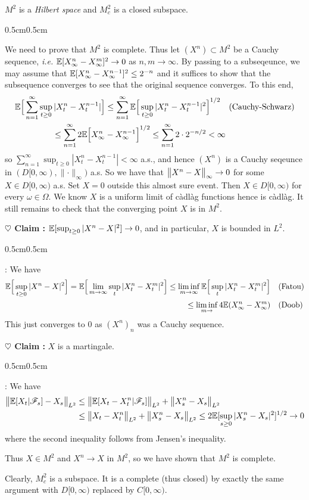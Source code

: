 \documentclass[12pt,a4paper]{article}
\newenvironment{proof}
{\begin{changemargin}{0.5cm}{0.5cm} 
	}%
	{\end{changemargin}
}
\newenvironment{subproof}
{\begin{changemargin}{0.5cm}{0.5cm} 
	}%
	{\end{changemargin}
}
\newenvironment{p}
{\begin{proof} 
	}%
	{\end{proof}
}
\begin{document}
\prop $M^2$ is a \emph{Hilbert space} and $M_c^2$ is a closed subspace.
\begin{p}
\pf We need to prove that $M^2$ is complete. Thus let $(X^n) \subset M^2$ be a Cauchy sequence, \textit{i.e.} $\mathbb{E}[X_{\infty}^n - X_{\infty}^m]^2 \rightarrow 0$ as $n,m\rightarrow \infty$. By passing to a subseqeunce, we may assume that $\mathbb{E}[X_{\infty}^n - X_{\infty}^{n-1}]^2 \leq 2^{-n}$ and it suffices to show that the subsequence converges to see that the original sequence converges. To this end,
\begin{align*}
\mathbb{E} \Big[ \sum_{n=1}^{\infty} \sup_{t\geq 0} |X_t^n - X_t^{n-1}| \Big] \leq \sum_{n=1}^{\infty} \mathbb{E} \Big[\sup_{t\geq 0} |X_t^n - X_t^{n-1}|^2 & \Big]^{1/2} \quad \text{(Cauchy-Schwarz)}\\
\leq \sum_{n=1}^{\infty} 2\mathbb{E} \Big[ X_{\infty}^n - X_{\infty}^{n-1}\Big]^{1/2} \leq \sum_{n=1}^{\infty} 2\cdot 2^{-n/2} & < \infty 
\end{align*}
so
$\sum_{n=1}^{\infty} \sup_{t\geq 0} |X_t^n - X_t^{n-1}|< \infty$ a.s., and hence $(X^n)$ is a Cauchy seqeunce in $(D[0, \infty),\parallel \cdot \parallel_{\infty})$ a.s. So we have that $\bigl\lVert X^n -X\bigr\rVert_{\infty} \rightarrow 0$ for some $X\in D[0, \infty)$ a.s. Set $X=0$ outside this almost sure event. Then $X\in D[0,\infty)$ for every $\omega \in \Omega$. We know $X$ is a uniform limit of c\`adl\`ag functions hence is c\`adl\`ag. It still remains to check that the converging point $X$ is in $M^2$.

\textbf{$\heartsuit$ Claim :} $\mathbb{E}[\sup_{t\geq 0} |X^n -X|^2] \rightarrow 0$, and in particular, $X$ is bounded in $L^2$.
\begin{subproof}
: We have
\begin{align*}
\mathbb{E} \Big[\sup_{t\geq 0}|X^n -X|^2 \Big] = \mathbb{E} \Big[ \lim_{m\rightarrow \infty} \sup_{t} |X_t^n -X_t^m|^2\Big] \leq \liminf_{m\rightarrow \infty}\mathbb{E}\Big[ \sup_t |X_t^n -X_t^{m}|^2\Big]& \quad \text{(Fatou)} \\
\leq \liminf_{m\rightarrow} 4 \mathbb{E}(X_{\infty}^n -X_{\infty}^m)& \quad \text{(Doob)}
\end{align*}
This just converges to 0 as $(X^n)_n$ was a Cauchy sequence. 
\end{subproof}
\textbf{$\heartsuit$ Claim :} $X$ is a martingale.
\begin{subproof}
: We have
\begin{align*}
\bigl\lVert\mathbb{E}[X_t | \mathscr{F}_s] - X_s\bigr\rVert_{L^2}& \leq \bigl\lVert\mathbb{E}[X_t -X_t^n | \mathscr{F}_s]\bigr\rVert_{L^2} + \bigl\lVert X_s^n -X_s\bigr\rVert_{L^2} \\
&\leq \bigl\lVert X_t -X_t^n\bigr\rVert_{L^2} + \bigl\lVert X_s^n - X_s\bigr\rVert_{L^2} \leq 2\mathbb{E}[\sup_{s\geq 0}|X_s^n -X_s|^2]^{1/2} \rightarrow 0
\end{align*}
where the second inequality follows from Jensen's inequality.
\end{subproof}
Thus $X\in M^2$ and $X^n \rightarrow X$ in $M^2$, so we have shown that $M^2$ is complete.
\s

Clearly, $M_c^2$ is a subspace. It is a complete (thus closed) by exactly the same argument with $D[0, \infty)$ replaced by $C[0, \infty)$.

\eop
\end{p}
\end{document}
